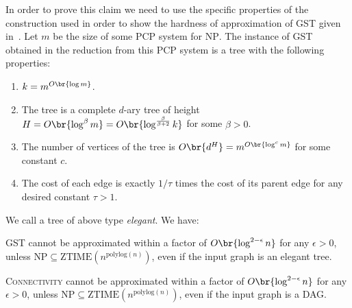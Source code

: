 In order to prove this claim we need to use the specific properties of the construction used in order to show the hardness of approximation of \textsc{GST} given in~\cite{PolylogarithmicInapproximability}. 
Let $m$ be the size of some PCP system for $\text{NP}$. The instance of \textsc{GST} obtained in the reduction from this PCP system is a tree with the following properties:
\begin{enumerate}
    \item $k=m^{O\br{\log m}}$.
    \item The tree is a complete $d$-ary tree of height $H=O\br{\log^{\beta} m}=O\br{\log^{\frac{\beta}{\beta+2}} k}$ for some $\beta > 0$.
    \item The number of vertices of the tree is $O\br{d^H} = m^{O\br{\log^c m}}$ for some constant $c$.
    \item The cost of each edge is exactly $1/\tau$ times the cost of its parent edge for any desired constant $\tau > 1$.
\end{enumerate}
We call a tree of above type \emph{elegant}. We have:
\begin{theorem}
    \textsc{GST} cannot be approximated within a factor of $O\br{\log^{2-\epsilon} n}$ for any $\epsilon > 0$, unless $\text{NP} \subseteq \text{ZTIME}(n^{\text{polylog}(n)})$, even if the input graph is an elegant tree.
\end{theorem}
\begin{theorem}
    \textsc{Connectivity} cannot be approximated within a factor of $O\br{\log^{2-\epsilon} n}$ for any $\epsilon > 0$, unless $\text{NP} \subseteq \text{ZTIME}(n^{\text{polylog}(n)})$, even if the input graph is a DAG.
\end{theorem}
